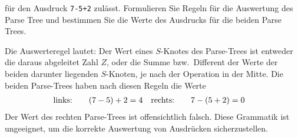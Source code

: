 für den Ausdruck \texttt{7-5+2} zulässt.
Formulieren Sie Regeln für die Auswertung des Parse Tree und bestimmen
Sie die Werte des Ausdrucks für die beiden Parse Trees.

\begin{loesung}
Die Auswerteregel lautet:
Der Wert eines $S$-Knotes des Parse-Trees ist entweder die daraus
abgeleitet Zahl $Z$, oder die Summe bzw.~Different der Werte der beiden
darunter liegenden $S$-Knoten, je nach der Operation in der Mitte.
Die beiden Parse-Trees haben nach diesen Regeln die Werte
\begin{align*}
\text{links:\qquad}&(7-5)+2=4
&
\text{rechts:\qquad}&7-(5+2)=0
\end{align*}
Der Wert des rechten Parse-Trees ist offensichtlich falsch.
Diese Grammatik ist ungeeignet, um die korrekte Auswertung
von Ausdrücken sicherzustellen.
\end{loesung}


